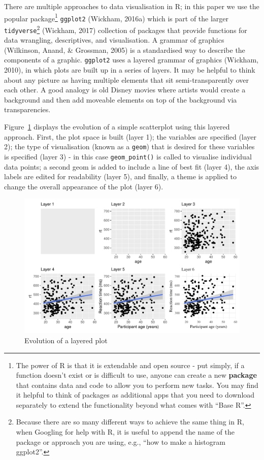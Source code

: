 \documentclass[
  english,
  doc,floatsintext]{apa6}
\begin{document}
There are multiple approaches to data visualisation in R; in this paper we use the popular package\footnote{The power of R is that it is extendable and open source - put simply, if a function doesn't exist or is difficult to use, anyone can create a new \textbf{package} that contains data and code to allow you to perform new tasks. You may find it helpful to think of packages as additional apps that you need to download separately to extend the functionality beyond what comes with ``Base R''.} \texttt{ggplot2} (Wickham, 2016a) which is part of the larger \texttt{tidyverse}\footnote{Because there are so many different ways to achieve the same thing in R, when Googling for help with R, it is useful to append the name of the package or approach you are using, e.g., ``how to make a histogram ggplot2''.} (Wickham, 2017) collection of packages that provide functions for data wrangling, descriptives, and visualisation. A grammar of graphics (Wilkinson, Anand, \& Grossman, 2005) is a standardised way to describe the components of a graphic. \texttt{ggplot2} uses a layered grammar of graphics (Wickham, 2010), in which plots are built up in a series of layers. It may be helpful to think about any picture as having multiple elements that sit semi-transparently over each other. A good analogy is old Disney movies where artists would create a background and then add moveable elements on top of the background via transparencies.

Figure~\ref{fig:layers} displays the evolution of a simple scatterplot using this layered approach. First, the plot space is built (layer 1); the variables are specified (layer 2); the type of visualisation (known as a \texttt{geom}) that is desired for these variables is specified (layer 3) - in this case \texttt{geom\_point()} is called to visualise individual data points; a second geom is added to include a line of best fit (layer 4), the axis labels are edited for readability (layer 5), and finally, a theme is applied to change the overall appearance of the plot (layer 6).

\begin{figure}

{\centering \includegraphics[width=1\linewidth]{images/layers-1} 

}

\caption{Evolution of a layered plot}\label{fig:layers}
\end{figure}
\end{document}
